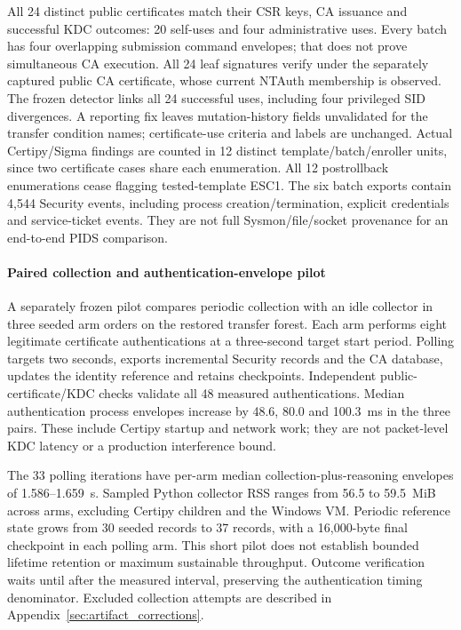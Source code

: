 All 24 distinct public certificates match their CSR keys, CA issuance and successful KDC outcomes: 20 self-uses and four administrative uses. Every batch has four overlapping submission command envelopes; that does not prove simultaneous CA execution. All 24 leaf signatures verify under the separately captured public CA certificate, whose current NTAuth membership is observed. The frozen detector links all 24 successful uses, including four privileged SID divergences. A reporting fix leaves mutation-history fields unvalidated for the transfer condition names; certificate-use criteria and labels are unchanged. Actual Certipy/Sigma findings are counted in 12 distinct template/batch/enroller units, since two certificate cases share each enumeration. All 12 postrollback enumerations cease flagging tested-template ESC1. The six batch exports contain 4,544 Security events, including process creation/termination, explicit credentials and service-ticket events. They are not full Sysmon/file/socket provenance for an end-to-end PIDS comparison.

\paragraph{Paired collection and authentication-envelope pilot}
A separately frozen pilot compares periodic collection with an idle collector in three seeded arm orders on the restored transfer forest. Each arm performs eight legitimate certificate authentications at a three-second target start period. Polling targets two seconds, exports incremental Security records and the CA database, updates the identity reference and retains checkpoints. Independent public-certificate/KDC checks validate all 48 measured authentications. Median authentication process envelopes increase by 48.6, 80.0 and 100.3~ms in the three pairs. These include Certipy startup and network work; they are not packet-level KDC latency or a production interference bound.

The 33 polling iterations have per-arm median collection-plus-reasoning envelopes of 1.586--1.659~s. Sampled Python collector RSS ranges from 56.5 to 59.5~MiB across arms, excluding Certipy children and the Windows VM. Periodic reference state grows from 30 seeded records to 37 records, with a 16,000-byte final checkpoint in each polling arm. This short pilot does not establish bounded lifetime retention or maximum sustainable throughput. Outcome verification waits until after the measured interval, preserving the authentication timing denominator. Excluded collection attempts are described in Appendix~\ref{sec:artifact_corrections}.

